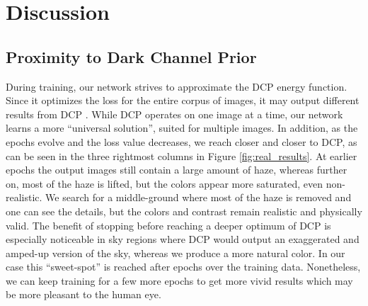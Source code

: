 \documentclass[10pt,twocolumn,twoside]{IEEEtran}
\begin{document}
\begin{table} 
 \caption{Average runtime and performance of SOTS-outdoor}
 \label{tbl:runtimes}
 \centering
 \def\arraystretch{1.2}
\end{table}

\section{Discussion}\label{discussion}

\subsection{Proximity to Dark Channel Prior}\label{proximity_DCP}
During training, our network strives to approximate the DCP energy function. Since it optimizes the loss for the entire corpus of images, it may output different results from DCP \cite{DCP}. While DCP operates on one image at a time, our network learns a more ``universal solution'', suited for multiple images. In addition, as the epochs evolve and the loss value decreases, we reach closer and closer to DCP, as can be seen in the three rightmost columns in Figure \ref{fig:real_results}. At earlier epochs the output images still contain a large amount of haze, whereas further on, most of the haze is lifted, but the colors appear more saturated, even non-realistic. We search for a middle-ground where most of the haze is removed and one can see the details, but the colors and contrast remain realistic and physically valid. The benefit of stopping before reaching a deeper optimum of DCP is especially noticeable in sky regions where DCP would output an exaggerated and amped-up version of the sky, whereas we produce a more natural color. In our case this ``sweet-spot'' is reached after  epochs over the training data. Nonetheless, we can keep training for a few more epochs to get more vivid results which may be more pleasant to the human eye.
\end{document}
